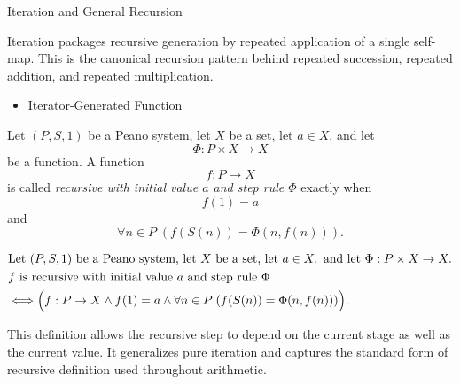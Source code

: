 \begin{topicbox}{Iteration and General Recursion}
\begin{remark*}[Interpretation]
Iteration packages recursive generation by repeated application of a single
self-map. This is the canonical recursion pattern behind repeated succession,
repeated addition, and repeated multiplication.
\end{remark*}

\begin{remark*}[Dependencies]
\begin{itemize}
  \item \hyperref[def:iterator-generated-function]{Iterator-Generated Function}
\end{itemize}
\end{remark*}

\begin{tcolorbox}[colback=defbox, colframe=defborder, arc=2pt,
  left=6pt, right=6pt, top=4pt, bottom=4pt,
  title={\small\textbf{Definition (Recursive Function on a Peano System)}},
  fonttitle=\small\bfseries]
\begin{definition}
\label{def:recursive-function-on-peano-system}
Let $(P,S,1)$ be a Peano system, let $X$ be a set, let $a \in X$, and let
\[
\Phi : P \times X \to X
\]
be a function. A function
\[
f : P \to X
\]
is called \emph{recursive with initial value $a$ and step rule $\Phi$} exactly
when
\[
f(1)=a
\]
and
\[
\forall n \in P\;(f(S(n))=\Phi(n,f(n))).
\]
\end{definition}
\end{tcolorbox}

\begin{remark*}
\[
\begin{aligned}
&\text{Let } (P,S,1) \text{ be a Peano system, let } X \text{ be a set, let } a \in X, \text{ and let } \Phi : P \times X \to X.\\
&f \text{ is recursive with initial value } a \text{ and step rule } \Phi\\
&\Longleftrightarrow
\Bigl(f : P \to X \land f(1)=a \land
\forall n \in P\;(f(S(n))=\Phi(n,f(n)))\Bigr).
\end{aligned}
\]
\end{remark*}

\begin{remark*}[Interpretation]
This definition allows the recursive step to depend on the current stage as
well as the current value. It generalizes pure iteration and captures the
standard form of recursive definition used throughout arithmetic.
\end{remark*}


\end{topicbox}
